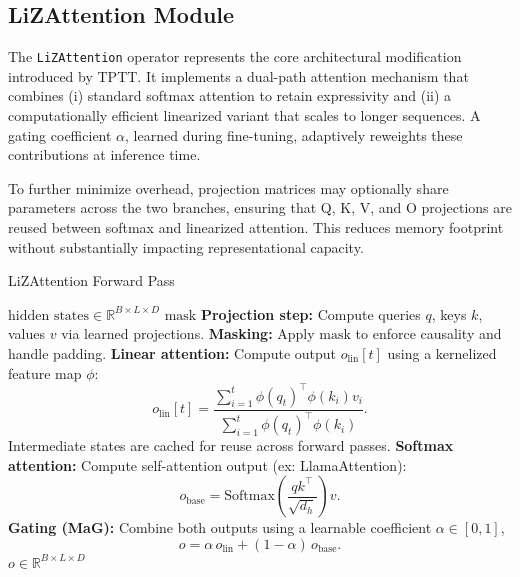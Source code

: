 \documentclass[10pt,a4paper]{article}
\begin{document}
\subsection{LiZAttention Module}

The \texttt{LiZAttention} operator represents the core architectural modification introduced by TPTT. It implements a dual-path attention mechanism that combines (i) standard softmax attention to retain expressivity and (ii) a computationally efficient linearized variant that scales to longer sequences. A gating coefficient $\alpha$, learned during fine-tuning, adaptively reweights these contributions at inference time.

To further minimize overhead, projection matrices may optionally share parameters across the two branches, ensuring that Q, K, V, and O projections are reused between softmax and linearized attention. This reduces memory footprint without substantially impacting representational capacity.

\begin{algorithm}[H]
\caption{LiZAttention Forward Pass}
\label{alg:lizattention}
\begin{algorithmic}[1]
\Require $\text{hidden states} \in \mathbb{R}^{B \times L \times D}$ 
\Require $\text{mask}$ 
\State \textbf{Projection step:} Compute queries $q$, keys $k$, values $v$ via learned projections.
\State \textbf{Masking:} Apply $\text{mask}$ to enforce causality and handle padding.
\State \textbf{Linear attention:} Compute output $o_{\mathrm{lin}}[t]$ using a kernelized feature map $\phi$:
\begin{equation*}
o_{\mathrm{lin}}[t] = \frac{\sum_{i=1}^{t} \phi(q_t)^\top \phi(k_i) v_i}{\sum_{i=1}^{t} \phi(q_t)^\top \phi(k_i)}.
\end{equation*}
Intermediate states are cached for reuse across forward passes.
\State \textbf{Softmax attention:} Compute self-attention output (ex: LlamaAttention):
\begin{equation*}
o_{\mathrm{base}} = \text{Softmax}\left(\frac{q k^\top}{\sqrt{d_h}}\right) v.
\end{equation*}
\State \textbf{Gating (MaG):} Combine both outputs using a learnable coefficient $\alpha \in [0,1]$,
\begin{equation*}
o = \alpha \, o_{\mathrm{lin}} + (1-\alpha) \, o_{\mathrm{base}}.
\end{equation*}
\State \Return $o \in \mathbb{R}^{B \times L \times D}$
\end{algorithmic}
\end{algorithm}
\end{document}
